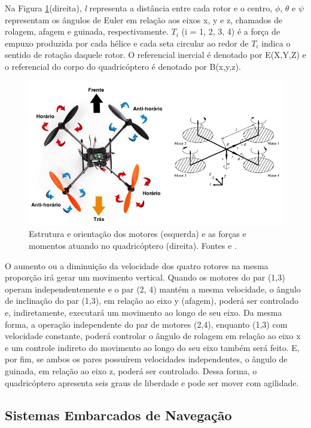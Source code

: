 \documentclass[a4paper, 12pt]{article}
\begin{document}
Na Figura \ref{fig:diag quad}(direita), \textit{l} representa a distância entre cada rotor e o centro, $\phi$, $\theta$ e $\psi$ representam os ângulos de Euler em relação aos eixos x, y e z, chamados de rolagem, afagem e guinada, respectivamente. $T_i$ (i = 1, 2, 3, 4) é a força de empuxo produzida por cada hélice e cada seta circular ao redor de $T_i$ indica o sentido de rotação daquele rotor. O referencial inercial é denotado por E(X,Y,Z) e o referencial do corpo do quadricóptero é denotado por B(x,y,z). 

\begin{figure}[h]
	\centering
		\includegraphics[scale=0.5]{img/diagrama_quadricoptero.png}
	\caption{Estrutura e orientação dos motores (esquerda) e as forças e momentos atuando no quadricóptero (direita). Fontes \cite{quadblog} e \cite{Mian2008}.}
	\label{fig:diag quad}
\end{figure}

O aumento ou a diminuição da velocidade dos quatro rotores na mesma proporção irá gerar um movimento vertical. Quando os motores do par (1,3) operam independentemente e o par (2, 4) mantém a mesma velocidade, o ângulo de inclinação do par (1,3), em relação ao eixo y (afagem), poderá ser controlado e, indiretamente, executará um movimento ao longo de seu eixo. Da mesma forma, a operação independente do par de motores (2,4), enquanto (1,3) com velocidade constante, poderá controlar o ângulo de rolagem em relação ao eixo x e um controle indireto do movimento ao longo do seu eixo também será feito. E, por fim, se ambos os pares possuírem velocidades independentes, o ângulo de guinada, em relação ao eixo z, poderá ser controlado. Dessa forma, o quadricóptero apresenta seis graus de liberdade e pode ser mover com agilidade. 

\subsection{Sistemas Embarcados de Navegação}
\end{document}
